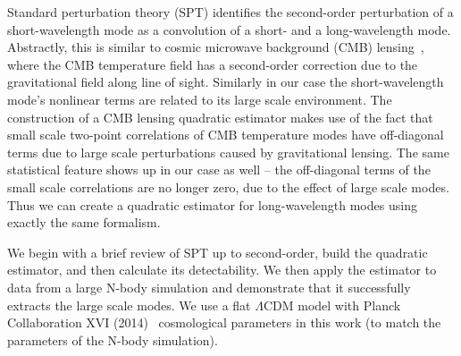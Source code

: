\documentclass[prd,amsmath,amssymb,floatfix,superscriptaddress,nofootinbib,twocolumn]{revtex4-1}
\begin{document}
Standard perturbation theory (SPT) \cite{Goroff:1986sts}\cite{Makino:1992fs}\cite{Jain:1994sop} identifies the second-order perturbation of a short-wavelength mode as a convolution of a short- and a long-wavelength mode. Abstractly, this is similar to
cosmic microwave background (CMB) lensing~\cite{Hu:2001dt}\cite{Hu:2002mr}, where the CMB temperature field has a second-order correction due to the gravitational field along line of sight. Similarly in our case the short-wavelength mode's nonlinear terms are related to its large scale environment.
The construction of a CMB lensing quadratic estimator makes use of the fact that small scale two-point correlations of CMB temperature modes have off-diagonal terms due to large scale perturbations caused by gravitational lensing. The same statistical feature shows up in our case as well -- the off-diagonal terms of the small scale correlations are no longer zero, due to the effect of large scale modes. Thus we can create a quadratic estimator for long-wavelength modes using exactly the same formalism. 

We begin with a brief review of SPT up to second-order, build the quadratic estimator, and then calculate its detectability. We then apply the estimator to data from a large N-body simulation and demonstrate that it successfully extracts the large scale modes. 
We use a flat $\Lambda$CDM model with Planck Collaboration XVI (2014)~\cite{Planck:2014cos} cosmological parameters in this work (to match the parameters of the N-body simulation).
\end{document}
